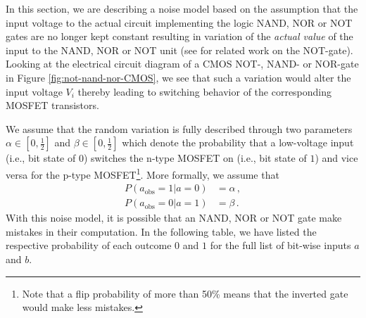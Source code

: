 \label{sec:noisy_adders}
In this section, we are describing a noise model based on the assumption that the input voltage to the actual circuit implementing the logic NAND, NOR or NOT gates are no longer kept constant resulting in variation of the {\em actual value} of the input to the NAND, NOR or NOT unit (see \cite{LiMunPat2006l} for related work on the NOT-gate). Looking at the electrical circuit diagram of a CMOS NOT-, NAND- or NOR-gate in Figure \ref{fig:not-nand-nor-CMOS}, we see that such a variation would alter the input voltage $V_i$ thereby leading to switching behavior of the corresponding MOSFET transistors.

We assume that the random variation is fully described through two parameters $\alpha \in \left[0,\frac{1}{2}\right]$ and $\beta \in \left[0,\frac{1}{2}\right]$ which denote the probability that a low-voltage input (i.e., bit state of $0$) switches the n-type MOSFET on (i.e., bit state of $1$) and vice versa for the p-type MOSFET\footnote{Note that a flip probability of more than 50\% means that the inverted gate would make less mistakes.}. More formally, we assume that
\begin{align}
    P(a_\text{obs} = 1 | a = 0) & = \alpha\,, \label{eq:bit_flip_to_1} \\
    P(a_\text{obs} = 0 | a = 1) & = \beta\,. \label{eq:bit_flip_to_0}
\end{align}
With this noise model, it is possible that an NAND, NOR or NOT gate make mistakes in their computation. In the following table, we have listed the respective probability of each outcome $0$ and $1$ for the full list of bit-wise inputs $a$ and $b$.

